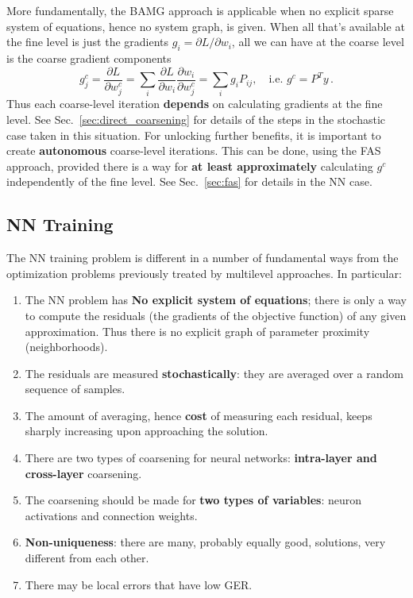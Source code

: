 \documentclass{article} %
\begin{document}
More fundamentally, the BAMG approach is applicable when no explicit sparse system of equations, hence no system graph, is given. When all that's available at the fine level is just the gradients $g_i = \partial L/\partial w_i$, all we can have at the coarse level is the coarse gradient components
$$
	g^c_j = \frac{\partial L}{\partial w^c_j} =
	\sum_i \frac{\partial L}{\partial w_i} \frac{\partial w_i}{\partial w_j^c} =
	\sum_i g_i P_{ij}, \quad {\mbox{i.e. }} g^c = P^T y\,.
$$
Thus each coarse-level iteration \textbf{depends} on calculating gradients at the fine level. See Sec.~\ref{sec:direct_coarsening} for details of the steps in the stochastic case taken in this situation. For unlocking further benefits, it is important to create \textbf{autonomous} coarse-level iterations. This can be done, using the FAS approach, provided there is a way for \textbf{at least approximately} calculating $g^c$ independently of the fine level. See Sec.~\ref{sec:fas} for details in the NN case.

\subsection{NN Training}
The NN training problem is different in a number of fundamental ways from the optimization problems previously treated by multilevel approaches. In particular:
\begin{enumerate}
	\item The NN problem has \textbf{No explicit system of equations}; there is only a way to compute the residuals (the gradients of the objective function) of any given approximation. Thus there is no explicit graph of parameter proximity (neighborhoods).
	\item The residuals are measured \textbf{stochastically}: they are averaged over a random sequence of samples.
	\item The amount of averaging, hence  \textbf{cost} of measuring each residual, keeps sharply increasing upon approaching the solution.
	\item There are two types of coarsening for neural networks: \textbf{intra-layer and cross-layer} coarsening.
	\item The coarsening should be made for \textbf{two types of variables}: neuron activations and connection weights.
	\item \textbf{Non-uniqueness}: there are many, probably equally good, solutions, very different from each other.
	\item There may be local errors that have low GER.
\end{enumerate}
\end{document}
